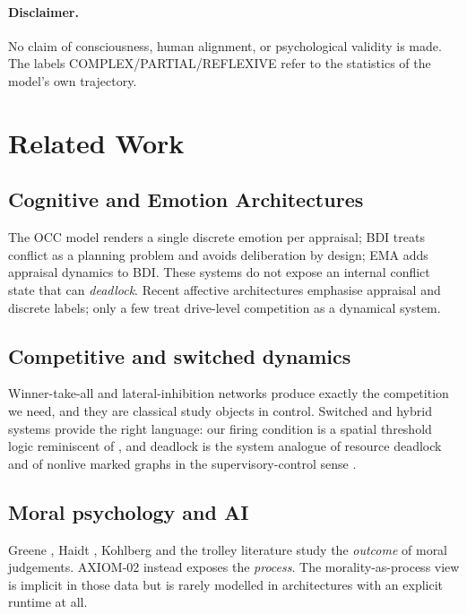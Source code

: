 \documentclass[journal]{IEEEtran}
\begin{document}
\paragraph{Disclaimer.}
No claim of consciousness, human alignment, or psychological validity is
made. The labels COMPLEX/PARTIAL/REFLEXIVE refer to the statistics of the
model's own trajectory.

\section{Related Work}
\label{sec:related}

\subsection{Cognitive and Emotion Architectures}
The OCC model \cite{ortony1988,gratch2014} renders a single discrete
emotion per appraisal; BDI \cite{bratman1987,rao1995} treats conflict as
a planning problem and avoids deliberation by design; EMA \cite{marsella2009} adds appraisal dynamics to BDI. These systems do not expose an
internal conflict state that can \emph{deadlock}. Recent affective
architectures \cite{picard1997,russell1980,sloman2009,rolls2013,ledoux1996,panskepp2004,minsky2006} emphasise appraisal and discrete
labels; only a few treat drive-level competition as a dynamical system.

\subsection{Competitive and switched dynamics}
Winner-take-all and lateral-inhibition networks
\cite{grossberg1976,grossberg1973,amari1977,hopfield1982,cohengrossberg1983,hahnloser2000,yuille2003,redgrave1999} produce exactly the competition we need, and they are
classical study objects in control. Switched and hybrid systems
\cite{branicky1998,hespanha2004,shorten2007,lin2009,vanderschaft2000,goebel2012,hespanhamorse1999,liberzonmorse1999,sunge2011,branicky2000proc} provide
the right language: our firing condition is a spatial threshold logic
reminiscent of \cite{mcculloch1943}, and deadlock is the system analogue
of resource deadlock \cite{coffman1971} and of nonlive marked graphs in
the supervisory-control sense \cite{ramadgewonham1987}.

\subsection{Moral psychology and AI}
Greene \cite{greene2001}, Haidt \cite{haidt2001}, Kohlberg
\cite{kohlberg1981} and the trolley literature
\cite{thomson1985,awad2018} study the \emph{outcome} of moral
judgements. AXIOM-02 instead exposes the \emph{process}. The
morality-as-process view is implicit in those data but is rarely
modelled in architectures with an explicit runtime at all.
\end{document}
